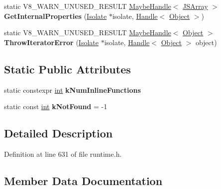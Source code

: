 \begin{DoxyCompactItemize}
static V8\+\_\+\+W\+A\+R\+N\+\_\+\+U\+N\+U\+S\+E\+D\+\_\+\+R\+E\+S\+U\+LT \mbox{\hyperlink{classv8_1_1internal_1_1MaybeHandle}{Maybe\+Handle}}$<$ \mbox{\hyperlink{classv8_1_1internal_1_1JSArray}{J\+S\+Array}} $>$ {\bfseries Get\+Internal\+Properties} (\mbox{\hyperlink{classv8_1_1internal_1_1Isolate}{Isolate}} $\ast$isolate, \mbox{\hyperlink{classv8_1_1internal_1_1Handle}{Handle}}$<$ \mbox{\hyperlink{classv8_1_1internal_1_1Object}{Object}} $>$)
\item 
\mbox{\label{classv8_1_1internal_1_1Runtime_a7f0b80291e8df1a6200af12b4c44adde}} 
static V8\+\_\+\+W\+A\+R\+N\+\_\+\+U\+N\+U\+S\+E\+D\+\_\+\+R\+E\+S\+U\+LT \mbox{\hyperlink{classv8_1_1internal_1_1MaybeHandle}{Maybe\+Handle}}$<$ \mbox{\hyperlink{classv8_1_1internal_1_1Object}{Object}} $>$ {\bfseries Throw\+Iterator\+Error} (\mbox{\hyperlink{classv8_1_1internal_1_1Isolate}{Isolate}} $\ast$isolate, \mbox{\hyperlink{classv8_1_1internal_1_1Handle}{Handle}}$<$ \mbox{\hyperlink{classv8_1_1internal_1_1Object}{Object}} $>$ object)
\end{DoxyCompactItemize}
\subsection*{Static Public Attributes}
\begin{DoxyCompactItemize}
\item 
static constexpr \mbox{\hyperlink{classint}{int}} {\bfseries k\+Num\+Inline\+Functions}
\item 
\mbox{\label{classv8_1_1internal_1_1Runtime_a15cd342f4d259e6ca8751f01bf7915be}} 
static const \mbox{\hyperlink{classint}{int}} {\bfseries k\+Not\+Found} = -\/1
\end{DoxyCompactItemize}


\subsection{Detailed Description}


Definition at line 631 of file runtime.\+h.



\subsection{Member Data Documentation}
\mbox{\label{classv8_1_1internal_1_1Runtime_ac44c8c74921965a3f85f454a37632ff2}} 
